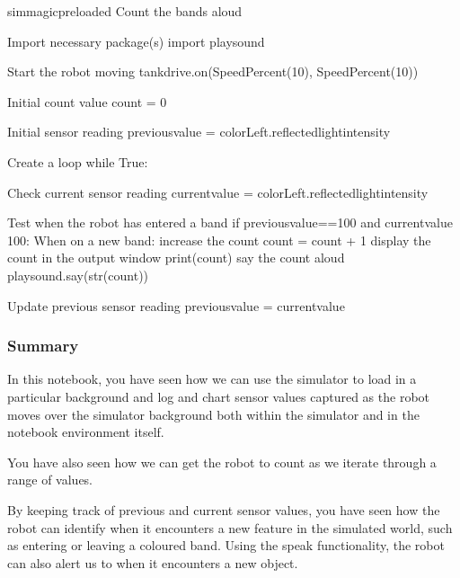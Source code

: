 \documentclass[letterpaper,10pt,english]{sphinxmanual}
\begin{document}
{
\begin{sphinxVerbatim}[commandchars=\\\{\}]
\llap{\color{nbsphinxin}[ ]:\,\hspace{\fboxrule}\hspace{\fboxsep}}\PYGZpc{}\PYGZpc{}sim\PYGZus{}magic\PYGZus{}preloaded
\PYGZsh{} Count the bands aloud

\PYGZsh{} Import necessary package(s)
import playsound

\PYGZsh{} Start the robot moving
tank\PYGZus{}drive.on(SpeedPercent(10), SpeedPercent(10))

\PYGZsh{} Initial count value
count = 0

\PYGZsh{} Initial sensor reading
previous\PYGZus{}value = colorLeft.reflected\PYGZus{}light\PYGZus{}intensity

\PYGZsh{} Create a loop
while True:

    \PYGZsh{} Check current sensor reading
    current\PYGZus{}value = colorLeft.reflected\PYGZus{}light\PYGZus{}intensity

    \PYGZsh{} Test when the robot has entered a band
    if previous\PYGZus{}value==100 and current\PYGZus{}value \PYGZlt{} 100:
        \PYGZsh{} When on a new band:
        \PYGZsh{} \PYGZhy{} increase the count
        count = count + 1
        \PYGZsh{} \PYGZhy{} display the count in the output window
        print(count)
        \PYGZsh{} \PYGZhy{} say the count aloud
        playsound.say(str(count))

    \PYGZsh{} Update previous sensor reading
    previous\PYGZus{}value = current\PYGZus{}value
\end{sphinxVerbatim}
}


\subsubsection{Summary}
\label{\detokenize{content/00_SOFTWARE_GUIDE/Section_00_03_quick_practical_tour:Summary}}
In this notebook, you have seen how we can use the simulator to load in a particular background and log and chart sensor values captured as the robot moves over the simulator background both within the simulator and in the notebook environment itself.

You have also seen how we can get the robot to count as we iterate through a range of values.

By keeping track of previous and current sensor values, you have seen how the robot can identify when it encounters a new feature in the simulated world, such as entering or leaving a coloured band. Using the speak functionality, the robot can also alert us to when it encounters a new object.
\end{document}
